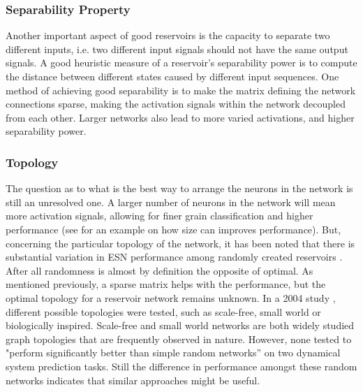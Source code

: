 \documentclass[12pt,oneside]{CUNY_CS_PhD}
\begin{document}
\subsubsection{Separability Property}
Another important aspect of good reservoirs is the capacity to separate two different inputs, i.e. two different input signals should not have the same output signals. A good heuristic measure of a reservoir's separability power is to compute the distance between different states caused by different input sequences. One method of achieving good separability is to make the matrix defining the network connections sparse, making the activation signals within the network decoupled from each other. Larger networks also lead to more varied activations, and higher separability power.

\subsubsection{Topology}
\label{topo}
The question as to what is the best way to arrange the neurons in the network is still an unresolved one. A larger number of neurons in the network will mean more activation signals, allowing for finer grain classification and higher performance (see \cite{triefenbach_phoneme_2010} for an example on how size can improves performance). But, concerning the particular topology of the network, it has been noted that there is substantial variation in ESN performance among randomly created reservoirs \cite{jiang2008supervised}. After all randomness is almost by definition the opposite of optimal. As mentioned previously, a sparse matrix helps with the performance, but the optimal topology for a reservoir network remains unknown. In a 2004 study \cite{Liebald2004}, different possible topologies were tested, such as scale-free, small world or biologically inspired. Scale-free and small world networks are both widely studied graph topologies that are frequently observed in nature. However, none tested to "perform significantly better than simple random networks'' on two dynamical system prediction tasks. Still the difference in performance amongst these random networks indicates that similar approaches might be useful.
\end{document}
